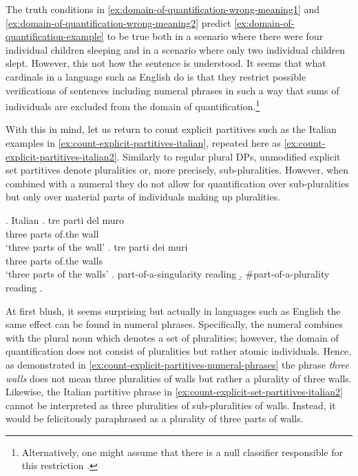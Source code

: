 The truth conditions in \ref{ex:domain-of-quantification-wrong-meaning1} and \ref{ex:domain-of-quantification-wrong-meaning2} predict \ref{ex:domain-of-quantification-example} to be true both in a scenario where there were four individual children sleeping and in a scenario where only two individual children slept. However, this not how the sentence is understood. It seems that what cardinals in a language such as English do is that they restrict possible verifications of sentences including numeral phrases in such a way that sums of individuals are excluded from the domain of quantification.\footnote{Alternatively, one might assume that there is a null classifier responsible for this restriction \citep[e.g.,][]{selkirk1977some,kobuchi-philip2006identity}.} 

With this in mind, let us return to count explicit partitives such as the Italian examples in \ref{ex:count-explicit-partitives-italian}, repeated here as \ref{ex:count-explicit-partitives-italian2}. Similarly to regular plural DPs, unmodified explicit set partitives denote pluralities or, more precisely, sub-pluralities. However, when combined with a numeral they do not allow for quantification over sub-pluralities but only over material parts of individuals making up pluralities.  

\ex.\label{ex:count-explicit-partitives-italian2} Italian \citep[p. 186; adapted]{schwarzschild1996pluralities}
\ag. tre parti del muro\label{ex:count-explicit-entity-partitives-italian2}\\
three parts of.the wall\\
`three parts of the wall'
\bg. tre parti dei muri\label{ex:count-explicit-set-partitives-italian2}\\
three parts of.the walls\\
`three parts of the walls'
\a. part-of-a-singularity reading
\b. \#part-of-a-plurality reading
\z.

At first blush, it seems surprising but actually in languages such as English the same effect can be found in numeral phrases. Specifically, the numeral combines with the plural noun which denotes a set of pluralities; however, the domain of quantification does not consist of pluralities but rather atomic individuals. Hence, as demonstrated in \ref{ex:count-explicit-partitives-numeral-phrases} the phrase \textit{three walls} does not mean three pluralities of walls but rather a plurality of three walls. Likewise, the Italian partitive phrase in \ref{ex:count-explicit-set-partitives-italian2} cannot be interpreted as three pluralities of sub-pluralities of walls. Instead, it would be felicitously paraphrased as a plurality of three parts of walls.


